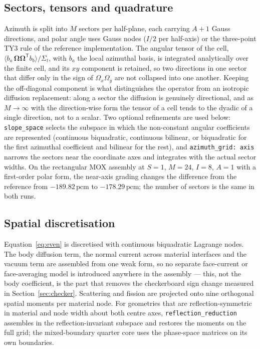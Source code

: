 \documentclass[11pt,a4paper]{article}
\newcommand{\pcm}{\,\mathrm{pcm}}
\begin{document}
\subsection{Sectors, tensors and quadrature}
Azimuth is split into $M$ sectors per half-plane, each carrying $A{+}1$ Gauss
directions, and polar angle uses Gauss nodes ($I/2$ per half-axis) or the
three-point TY3 rule of the reference implementation. The angular tensor of the
cell,
$\langle b_a\,\boldsymbol{\Omega}\boldsymbol{\Omega}^{\mathsf T}b_b\rangle/\Sigma_t$,
with $b_a$ the local azimuthal basis, is integrated analytically over the finite
cell, and its $xy$ component is retained, so two directions in one sector that
differ only in the sign of $\Omega_x\Omega_y$ are not collapsed into one another.
Keeping the off-diagonal component is what distinguishes the operator from an
isotropic diffusion replacement: along a sector the diffusion is genuinely
directional, and as $M\rightarrow\infty$ with the direction-wise form the tensor of
a cell tends to the dyadic of a single direction, not to a scalar.
Two optional refinements are used below: \texttt{slope\_space} selects the subspace
in which the non-constant angular coefficients are represented (continuous biquadratic,
continuous bilinear, or biquadratic for the first azimuthal coefficient and bilinear
for the rest), and \texttt{azimuth\_grid:\ axis} narrows the sectors near the
coordinate axes and integrates with the actual sector widths. On the rectangular MOX
assembly at $S{=}1$, $M{=}24$, $I{=}8$, $A{=}1$ with a first-order polar form, the
near-axis grading changes the difference from the reference from $-189.82\pcm$ to
$-178.29\pcm$; the number of sectors is the same in both runs.

\subsection{Spatial discretisation}
Equation~\eqref{eq:even} is discretised with continuous biquadratic Lagrange nodes.
The body diffusion term, the normal current across material interfaces and the
vacuum term are assembled from one weak form, so no separate face-current or
face-averaging model is introduced anywhere in the assembly --- this, not the body
coefficient, is the part that removes the checkerboard sign change measured in
Section~\ref{sec:checker}. Scattering and fission are projected onto nine
orthogonal spatial moments per material node. For geometries that are
reflection-symmetric in material and node width about both centre axes,
\texttt{reflection\_reduction} assembles in the reflection-invariant subspace and
restores the moments on the full grid; the mixed-boundary quarter core uses the
phase-space matrices on its own boundaries.
\end{document}

